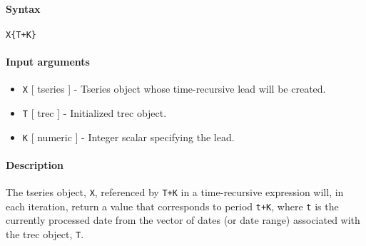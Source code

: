 


	\paragraph{Syntax}\label{syntax}

\begin{verbatim}
X{T+K}
\end{verbatim}

\paragraph{Input arguments}\label{input-arguments}

\begin{itemize}
\item
  \texttt{X} {[} tseries {]} - Tseries object whose time-recursive lead
  will be created.
\item
  \texttt{T} {[} trec {]} - Initialized trec object.
\item
  \texttt{K} {[} numeric {]} - Integer scalar specifying the lead.
\end{itemize}

\paragraph{Description}\label{description}

The tseries object, \texttt{X}, referenced by \texttt{T+K} in a
time-recursive expression will, in each iteration, return a value that
corresponds to period \texttt{t+K}, where \texttt{t} is the currently
processed date from the vector of dates (or date range) associated with
the trec object, \texttt{T}.


